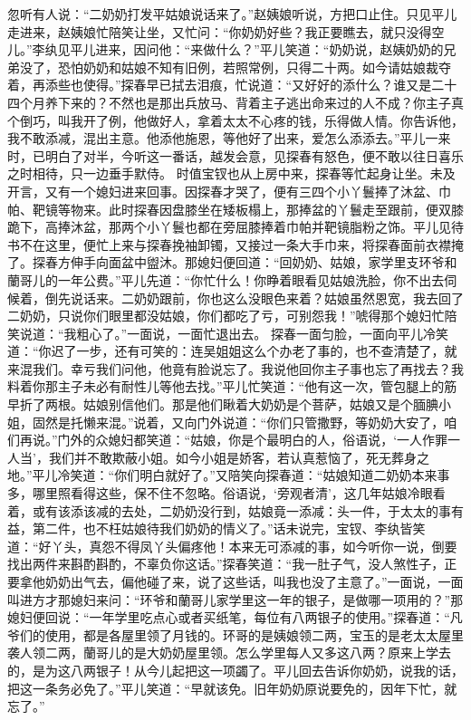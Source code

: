 \documentclass[12pt,oneside]{book}
\begin{document}
忽听有人说：“二奶奶打发平姑娘说话来了。”赵姨娘听说，方把口止住。只见平儿走进来，赵姨娘忙陪笑让坐，又忙问：“你奶奶好些？我正要瞧去，就只没得空儿。”李纨见平儿进来，因问他：“来做什么？”平儿笑道：“奶奶说，赵姨奶奶的兄弟没了，恐怕奶奶和姑娘不知有旧例，若照常例，只得二十两。如今请姑娘裁夺着，再添些也使得。”探春早已拭去泪痕，忙说道：“又好好的添什么？谁又是二十四个月养下来的？不然也是那出兵放马、背着主子逃出命来过的人不成？你主子真个倒巧，叫我开了例，他做好人，拿着太太不心疼的钱，乐得做人情。你告诉他，我不敢添减，混出主意。他添他施恩，等他好了出来，爱怎么添添去。”平儿一来时，已明白了对半，今听这一番话，越发会意，见探春有怒色，便不敢以往日喜乐之时相待，只一边垂手默侍。
时值宝钗也从上房中来，探春等忙起身让坐。未及开言，又有一个媳妇进来回事。因探春才哭了，便有三四个小丫鬟捧了沐盆、巾帕、靶镜等物来。此时探春因盘膝坐在矮板榻上，那捧盆的丫鬟走至跟前，便双膝跪下，高捧沐盆，那两个小丫鬟也都在旁屈膝捧着巾帕并靶镜脂粉之饰。平儿见待书不在这里，便忙上来与探春挽袖卸镯，又接过一条大手巾来，将探春面前衣襟掩了。探春方伸手向面盆中盥沐。那媳妇便回道：“回奶奶、姑娘，家学里支环爷和蘭哥儿的一年公费。”平儿先道：“你忙什么！你睁着眼看见姑娘洗脸，你不出去伺候着，倒先说话来。二奶奶跟前，你也这么没眼色来着？姑娘虽然恩宽，我去回了二奶奶，只说你们眼里都没姑娘，你们都吃了亏，可别怨我！”唬得那个媳妇忙陪笑说道：“我粗心了。”一面说，一面忙退出去。
探春一面匀脸，一面向平儿冷笑道：“你迟了一步，还有可笑的：连吴姐姐这么个办老了事的，也不查清楚了，就来混我们。幸亏我们问他，他竟有脸说忘了。我说他回你主子事也忘了再找去？我料着你那主子未必有耐性儿等他去找。”平儿忙笑道：“他有这一次，管包腿上的筋早折了两根。姑娘别信他们。那是他们瞅着大奶奶是个菩萨，姑娘又是个腼腆小姐，固然是托懒来混。”说着，又向门外说道：“你们只管撒野，等奶奶大安了，咱们再说。”门外的众媳妇都笑道：“姑娘，你是个最明白的人，俗语说，‘一人作罪一人当’，我们并不敢欺蔽小姐。如今小姐是娇客，若认真惹恼了，死无葬身之地。”平儿冷笑道：“你们明白就好了。”又陪笑向探春道：“姑娘知道二奶奶本来事多，哪里照看得这些，保不住不忽略。俗语说，‘旁观者清’，这几年姑娘冷眼看着，或有该添该减的去处，二奶奶没行到，姑娘竟一添减：头一件，于太太的事有益，第二件，也不枉姑娘待我们奶奶的情义了。”话未说完，宝钗、李纨皆笑道：“好丫头，真怨不得凤丫头偏疼他！本来无可添减的事，如今听你一说，倒要找出两件来斟酌斟酌，不辜负你这话。”探春笑道：“我一肚子气，没人煞性子，正要拿他奶奶出气去，偏他碰了来，说了这些话，叫我也没了主意了。”一面说，一面叫进方才那媳妇来问：“环爷和蘭哥儿家学里这一年的银子，是做哪一项用的？”那媳妇便回说：“一年学里吃点心或者买纸笔，每位有八两银子的使用。”探春道：“凡爷们的使用，都是各屋里领了月钱的。环哥的是姨娘领二两，宝玉的是老太太屋里袭人领二两，蘭哥儿的是大奶奶屋里领。怎么学里每人又多这八两？原来上学去的，是为这八两银子！从今儿起把这一项蠲了。平儿回去告诉你奶奶，说我的话，把这一条务必免了。”平儿笑道：“早就该免。旧年奶奶原说要免的，因年下忙，就忘了。”
\end{document}
